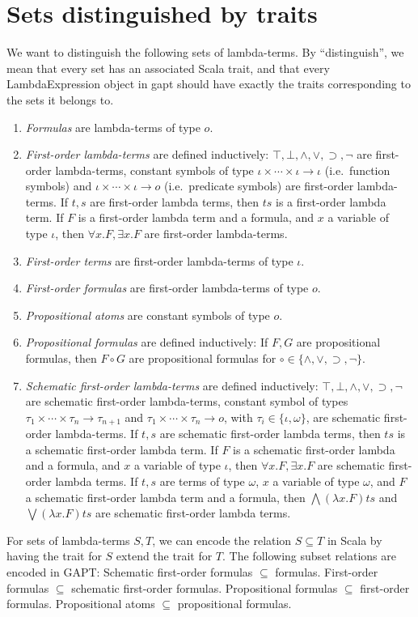 \documentclass[11pt,a4paper]{article}
\newcommand{\omicron}{o}
\newcommand{\ftype}{\omicron}
\newcommand{\itype}{\iota}
\newcommand{\atype}{\omega}
\newcommand{\impl}{\supset}
\begin{document}
\section{Sets distinguished by traits}
%
We want to distinguish the following sets of lambda-terms. By ``distinguish'', we mean that every set
has an associated Scala trait, and that every LambdaExpression object in gapt should have exactly the
traits corresponding to the sets it belongs to.
%
\begin{enumerate}
  \item {\em Formulas} are lambda-terms of type $\ftype$.
  \item {\em First-order lambda-terms} are defined inductively: $\top,\bot,\land,\lor,\impl,\neg$ 
    are first-order lambda-terms,
    constant symbols of type $\itype \times \cdots \times \itype \to \itype$ (i.e.~function symbols)
    and $\itype\times\cdots\times \itype \to \ftype$ (i.e.~predicate symbols)
    are first-order lambda-terms. If $t, s$ are first-order lambda terms, then $ts$ is a first-order lambda term.
    If $F$ is a first-order lambda term and a formula, and $x$ a variable of type $\itype$,
    then $\forall x.F, \exists x.F$ are first-order lambda-terms.
  \item {\em First-order terms} are first-order lambda-terms of type $\itype$.
  \item {\em First-order formulas} are first-order lambda-terms of type $\ftype$.
  \item {\em Propositional atoms} are constant symbols of type $\ftype$.
  \item {\em Propositional formulas} are defined inductively: If $F, G$ are propositional 
    formulas, then $F\circ G$ are propositional formulas for $\circ\in\{\land,\lor,\impl,\neg\}$.
  \item {\em Schematic first-order lambda-terms} are defined inductively:
    $\top,\bot,\land,\lor,\impl,\neg$ are schematic first-order
    lambda-terms, constant symbol of types $\tau_1\times \cdots \times \tau_n \to \tau_{n+1}$
    and $\tau_1\times \cdots \times \tau_n \to \ftype$, with $\tau_i\in\{\itype,\atype\}$, 
    are schematic first-order lambda-terms. If $t, s$ are schematic first-order lambda terms, then $ts$ is a schematic
    first-order lambda term. If $F$ is a schematic first-order lambda and a formula, and $x$ a variable of type 
    $\itype$, then $\forall x.F, \exists x.F$ are schematic first-order lambda terms. If $t,s$ are terms of type
    $\atype$, $x$ a variable of type $\atype$, and $F$ a schematic first-order lambda term and a formula, then
    $\bigwedge(\lambda x.F)ts$ and $\bigvee(\lambda x.F)ts$ are schematic first-order lambda terms.
   \end{enumerate}
%
For sets of lambda-terms $S,T$, we can encode the relation $S\subseteq T$ in Scala by
having the trait for $S$ extend the trait for $T$.
The following subset relations are encoded in GAPT: 
Schematic first-order formulas $\subseteq$ formulas.
First-order formulas $\subseteq$ schematic first-order formulas.
Propositional formulas $\subseteq$ first-order formulas.
Propositional atoms $\subseteq$ propositional formulas.
\end{document}
